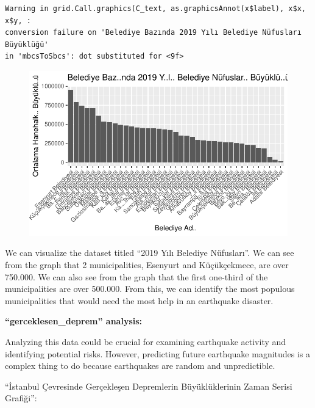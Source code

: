\documentclass[
  11pt,
  a4paper,
  DIV=11,
  numbers=noendperiod]{scrartcl}
\begin{document}
\begin{verbatim}
Warning in grid.Call.graphics(C_text, as.graphicsAnnot(x$label), x$x, x$y, :
conversion failure on 'Belediye Bazında 2019 Yılı Belediye Nüfusları Büyüklüğü'
in 'mbcsToSbcs': dot substituted for <9f>
\end{verbatim}

\begin{figure}[H]

{\centering \includegraphics{project_files/figure-pdf/unnamed-chunk-16-1.pdf}

}

\end{figure}

We can visualize the dataset titled ``2019 Yılı Belediye Nüfusları''. We
can see from the graph that 2 municipalities, Esenyurt and Küçükçekmece,
are over 750.000. We can also see from the graph that the first
one-third of the municipalities are over 500.000. From this, we can
identify the most populous municipalities that would need the most help
in an earthquake disaster.

\textbf{``gerceklesen\_deprem'' analysis:}

Analyzing this data could be crucial for examining earthquake activity
and identifying potential risks. However, predicting future earthquake
magnitudes is a complex thing to do because earthquakes are random and
unpredictible.

``İstanbul Çevresinde Gerçekleşen Depremlerin Büyüklüklerinin Zaman
Serisi Grafiği'':
\end{document}
